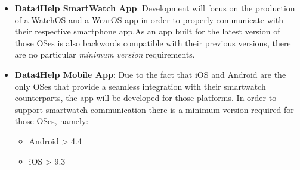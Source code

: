 \begin{itemize}
    \item \textbf{Data4Help SmartWatch App}: Development will focus on the production of a WatchOS and a WearOS app in order to properly communicate with their respective smartphone app.\newline As an app built for the latest version of those OSes is also backwords compatible with their previous versions, there are no particular \textit{minimum version} requirements.
    \item \textbf{Data4Help Mobile App}: Due to the fact that iOS and Android are the only OSes that provide a seamless integration with their smartwatch counterparts, the app will be developed for those platforms.
    In order to support smartwatch communication there is a minimum version required for those OSes, namely:
    \begin{itemize}
        \item Android \textgreater \vspace{0.1cm} 4.4
        \item iOS \textgreater \vspace{0.4cm} 9.3
    \end{itemize}
\end{itemize}

